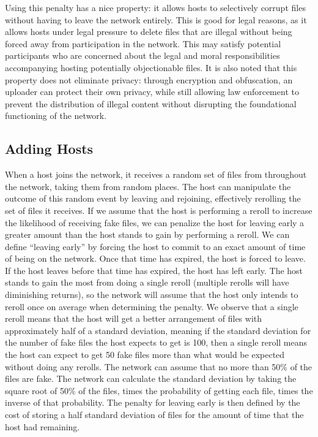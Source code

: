 \documentclass[twocolumn]{article}
\begin{document}
Using this penalty has a nice property: it allows hosts to selectively corrupt files without having to leave the network entirely.
This is good for legal reasons, as it allows hosts under legal pressure to delete files that are illegal without being forced away from participation in the network.
This may satisfy potential participants who are concerned about the legal and moral responsibilities accompanying hosting potentially objectionable files.
It is also noted that this property does not eliminate privacy: through encryption and obfuscation, an uploader can protect their own privacy, while still allowing law enforcement to prevent the distribution of illegal content without disrupting the foundational functioning of the network.

\subsection{Adding Hosts}
When a host joins the network, it receives a random set of files from throughout the network, taking them from random places.
The host can manipulate the outcome of this random event by leaving and rejoining, effectively rerolling the set of files it receives.
If we assume that the host is performing a reroll to increase the likelihood of receiving fake files, we can penalize the host for leaving early a greater amount than the host stands to gain by performing a reroll.
We can define ``leaving early'' by forcing the host to commit to an exact amount of time of being on the network.
Once that time has expired, the host is forced to leave.
If the host leaves before that time has expired, the host has left early.
The host stands to gain the most from doing a single reroll (multiple rerolls will have diminishing returns), so the network will assume that the host only intends to reroll once on average when determining the penalty.
We observe that a single reroll means that the host will get a better arrangement of files with approximately half of a standard deviation, meaning if the standard deviation for the number of fake files the host expects to get is 100, then a single reroll means the host can expect to get 50 fake files more than what would be expected without doing any rerolls.
The network can assume that no more than 50\% of the files are fake.
The network can calculate the standard deviation by taking the square root of 50\% of the files, times the probability of getting each file, times the inverse of that probability.
The penalty for leaving early is then defined by the cost of storing a half standard deviation of files for the amount of time that the host had remaining.
\end{document}

